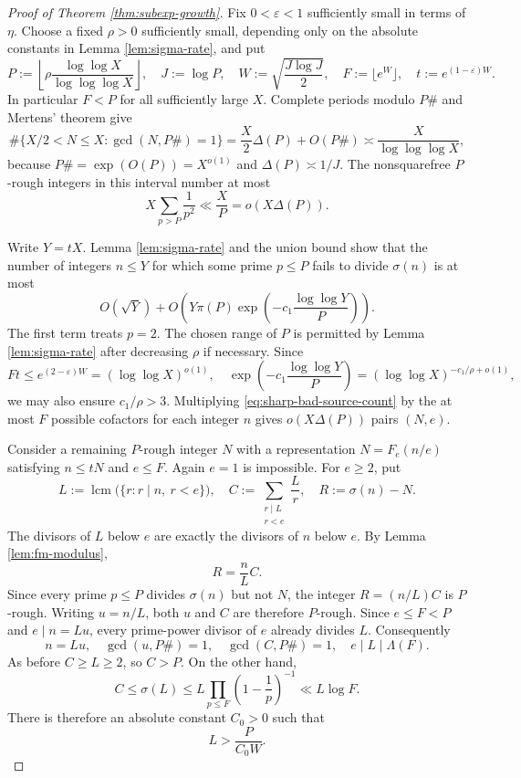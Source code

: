 \documentclass[11pt,letterpaper,reqno]{amsart}
\numberwithin{equation}{section}
\theoremstyle{remark}
\DeclareMathOperator{\lcm}{lcm}
\renewcommand{\leq}{\leqslant}
\renewcommand{\geq}{\geqslant}
\begin{document}
\begin{proof}[Proof of Theorem \ref{thm:subexp-growth}]
Fix $0<\varepsilon<1$ sufficiently small in terms of $\eta$. Choose a fixed
$\rho>0$ sufficiently small, depending only on the absolute constants in
Lemma \ref{lem:sigma-rate}, and put
\[
 P:=\left\lfloor\rho\frac{\log\log X}{\log\log\log X}\right\rfloor,
 \quad J:=\log P,
 \quad W:=\sqrt{\frac{J\log J}{2}},
 \quad F:=\lfloor e^W\rfloor,
 \quad t:=e^{(1-\varepsilon)W}.
\]
In particular $F<P$ for all sufficiently large $X$. Complete periods modulo
$P\#$ and Mertens' theorem give
\begin{equation}\label{eq:sharp-rough-target-count}
 \#\{X/2<N\leq X:\gcd(N,P\#)=1\}
 =\frac X2\Delta(P)+O(P\#)
 \asymp\frac X{\log\log\log X},
\end{equation}
because $P\#=\exp(O(P))=X^{o(1)}$ and $\Delta(P)\asymp1/J$. The
nonsquarefree $P$-rough integers in this interval number at most
\[
 X\sum_{p>P}\frac1{p^2}\ll\frac XP=o(X\Delta(P)).
\]

Write $Y=tX$. Lemma \ref{lem:sigma-rate} and the union bound show that the
number of integers $n\leq Y$ for which some prime $p\leq P$ fails to divide
$\sigma(n)$ is at most
\begin{equation}\label{eq:sharp-bad-source-count}
 O(\sqrt Y)+O\left(
 Y\pi(P)\exp\left(-c_1\frac{\log\log Y}{P}\right)
 \right).
\end{equation}
The first term treats $p=2$. The chosen range of $P$ is permitted by
Lemma \ref{lem:sigma-rate} after decreasing $\rho$ if necessary. Since
\[
 Ft\leq e^{(2-\varepsilon)W}=(\log\log X)^{o(1)},
 \quad
 \exp\left(-c_1\frac{\log\log Y}{P}\right)
 =(\log\log X)^{-c_1/\rho+o(1)},
\]
we may also ensure $c_1/\rho>3$. Multiplying
\eqref{eq:sharp-bad-source-count} by the at most $F$ possible cofactors for each
integer $n$ gives $o(X\Delta(P))$ pairs $(N,e)$.

Consider a remaining $P$-rough integer $N$ with a representation
$N=F_e(n/e)$ satisfying $n\leq tN$ and $e\leq F$. Again $e=1$ is impossible.
For $e\geq2$, put
\[
 L:=\lcm\bigl(\{r:r\mid n,\ r<e\}\bigr),\quad
 C:=\sum_{\substack{r\mid L\\r<e}}\frac Lr,\quad R:=\sigma(n)-N.
\]
The divisors of $L$ below $e$ are exactly the divisors of $n$ below $e$.
By Lemma \ref{lem:fm-modulus},
\[
 R=\frac nL C.
\]
Since
every prime $p\leq P$ divides $\sigma(n)$ but not $N$, the integer
$R=(n/L)C$ is $P$-rough. Writing $u=n/L$, both $u$ and $C$ are therefore
$P$-rough. Since $e\leq F<P$ and $e\mid n=Lu$, every prime-power divisor
of $e$ already divides $L$. Consequently
\[
 n=Lu,\quad \gcd(u,P\#)=1,\quad \gcd(C,P\#)=1,
 \quad e\mid L\mid \Lambda(F).
\]
As before $C\geq L\geq2$, so $C>P$. On the other hand,
\[
 C\leq\sigma(L)
 \leq L\prod_{p\leq F}\left(1-\frac1p\right)^{-1}
 \ll L\log F.
\]
There is therefore an absolute constant $C_0>0$ such that
\begin{equation}\label{eq:moving-kernel-lower-bound}
 L>\frac P{C_0W}.
\end{equation}


\end{proof}
\end{document}
